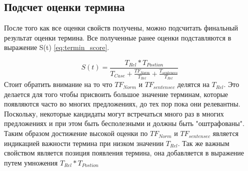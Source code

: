 \subsection{Подсчет оценки термина}
После того как все оценки свойств получены, можно подсчитать финальный результат оценки термина.
Все полученные ранее оценки подставляются в выражение S(t) \eqref{eq:termin_score}.

\begin{equation}
	\label{eq:termin_score}
	S(t) = \frac{T_{Rel} * T_{Postion}}{T_{Case} + \frac{TF_{Norm}}{T_{Rel}} + \frac{T_{sentences}}{T_{Rel}}}
\end{equation}
Стоит обратить внимание на то что $TF_{Norm}$ и $TF_{sentensec}$ делятся на $T_{Rel}$.
Это делается для того чтобы присвоить большое значение терминам, которые появляются часто во многих предложениях, до тех пор пока они релевантны.
Поскольку, некоторые кандидаты могут встречаться много раз в многих предложениях и при этом быть бесполезными и должны быть "оштрафованы".
Таким образом достижение высокой оценки по $TF_{Norm}$ и $TF_{sentensec}$ является индикацией важности термина при низком значении $T_{Rel}$.
Так же важным свойством является позиция появления термина, она добавляется в выражение путем умножения $T_{Rel} * T_{Postion}$

